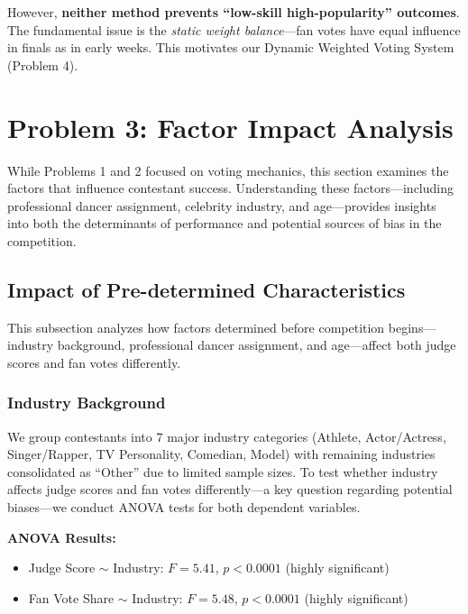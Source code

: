 \documentclass{mcmthesis}
\begin{document}
However, \textbf{neither method prevents ``low-skill high-popularity'' outcomes}. The fundamental issue is the \textit{static weight balance}---fan votes have equal influence in finals as in early weeks. This motivates our Dynamic Weighted Voting System (Problem 4).

\section{Problem 3: Factor Impact Analysis}

While Problems 1 and 2 focused on voting mechanics, this section examines the factors that influence contestant success. Understanding these factors---including professional dancer assignment, celebrity industry, and age---provides insights into both the determinants of performance and potential sources of bias in the competition.

\subsection{Impact of Pre-determined Characteristics}

This subsection analyzes how factors determined before competition begins---industry background, professional dancer assignment, and age---affect both judge scores and fan votes differently.

\subsubsection*{Industry Background}

We group contestants into 7 major industry categories (Athlete, Actor/Actress, Singer/Rapper, TV Personality, Comedian, Model) with remaining industries consolidated as ``Other'' due to limited sample sizes. To test whether industry affects judge scores and fan votes differently---a key question regarding potential biases---we conduct ANOVA tests for both dependent variables.

\textbf{ANOVA Results:}
\begin{itemize}
\item Judge Score $\sim$ Industry: $F = 5.41$, $p < 0.0001$ (highly significant)
\item Fan Vote Share $\sim$ Industry: $F = 5.48$, $p < 0.0001$ (highly significant)
\end{itemize}
\end{document}
